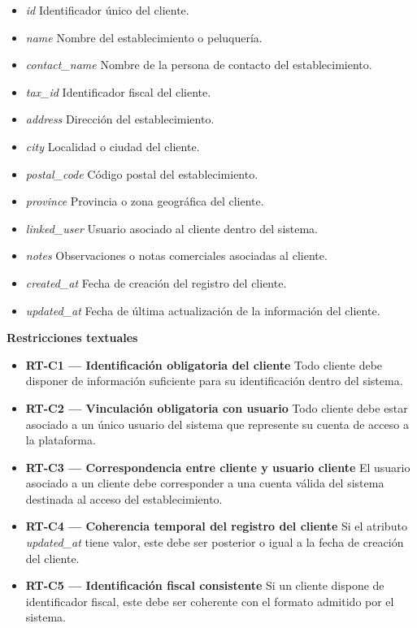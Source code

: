 \begin{itemize}
      \item \textit{id} Identificador único del cliente.
      \item \textit{name} Nombre del establecimiento o peluquería.
      \item \textit{contact\_name} Nombre de la persona de contacto del establecimiento.
      \item \textit{tax\_id} Identificador fiscal del cliente.
      \item \textit{address} Dirección del establecimiento.
      \item \textit{city} Localidad o ciudad del cliente.
      \item \textit{postal\_code} Código postal del establecimiento.
      \item \textit{province} Provincia o zona geográfica del cliente.
      \item \textit{linked\_user} Usuario asociado al cliente dentro del sistema.
      \item \textit{notes} Observaciones o notas comerciales asociadas al cliente.
      \item \textit{created\_at} Fecha de creación del registro del cliente.
      \item \textit{updated\_at} Fecha de última actualización de la información del cliente.
\end{itemize}

\textbf{Restricciones textuales}

\begin{itemize}
      \item \textbf{RT-C1 — Identificación obligatoria del cliente} Todo cliente debe disponer de información suficiente para su identificación dentro del sistema.
      \item \textbf{RT-C2 — Vinculación obligatoria con usuario} Todo cliente debe estar asociado a un único usuario del sistema que represente su cuenta de acceso a la plataforma.
      \item \textbf{RT-C3 — Correspondencia entre cliente y usuario cliente} El usuario asociado a un cliente debe corresponder a una cuenta válida del sistema destinada al acceso del establecimiento.
      \item \textbf{RT-C4 — Coherencia temporal del registro del cliente} Si el atributo \textit{updated\_at} tiene valor, este debe ser posterior o igual a la fecha de creación del cliente.
      \item \textbf{RT-C5 — Identificación fiscal consistente} Si un cliente dispone de identificador fiscal, este debe ser coherente con el formato admitido por el sistema.
\end{itemize}

